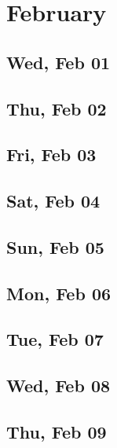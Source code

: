 \chapter{February}
	\section{Wed, Feb 01}
		
	\section{Thu, Feb 02}
		
	\section{Fri, Feb 03}
		
	\section{Sat, Feb 04}
		
	\section{Sun, Feb 05}
		
	\section{Mon, Feb 06}
		
	\section{Tue, Feb 07}
		
	\section{Wed, Feb 08}
		
	\section{Thu, Feb 09}
		
